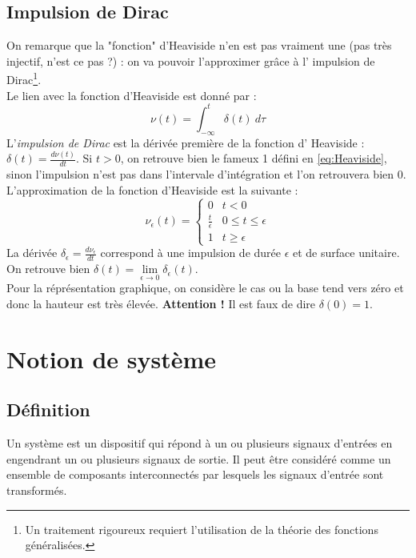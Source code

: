 	\subsection{Impulsion de Dirac}
	On remarque que la "fonction" d'Heaviside n'en est pas vraiment une (pas 
	très injectif, n'est ce pas ?) : on va pouvoir l'approximer grâce à l'
	impulsion de Dirac\footnote{Un traitement rigoureux requiert l'utilisation 
	de la théorie des fonctions généralisées.}.\\
	Le lien avec la fonction d'Heaviside est donné par : 
	\begin{equation}
	\nu(t) = \int_{-\infty}^t \delta(t)\ d\tau
	\end{equation}
	L'\textit{impulsion de Dirac} est la dérivée première de la fonction d'
	Heaviside : $\delta(t) = \frac{d\nu(t)}{dt}$. Si $t>0$, on retrouve bien 
	le fameux 1 défini en \autoref{eq:Heaviside}, sinon l'impulsion n'est pas 
	dans l'intervale d'intégration et l'on retrouvera bien 0.\\
	L'approximation de la fonction d'Heaviside est la suivante :
	\begin{equation}
	\nu_\epsilon(t) = \left\{\begin{array}{ll}
	0 & t<0\\
	\frac{t}{\epsilon}	 & 0\leq t \leq \epsilon\\
	1 & t \geq \epsilon
	\end{array}\right.
	\end{equation}
	La dérivée $\delta_\epsilon = \frac{d\nu_\epsilon}{dt}$ correspond à une 
	impulsion de durée $\epsilon$ et de surface unitaire. On retrouve bien 
	$\delta(t) = \lim\limits_{\epsilon\rightarrow0} \delta_\epsilon(t)$.\\
	Pour la réprésentation graphique, on considère le cas ou la base tend 
	vers zéro et donc la hauteur est très élevée. \textbf{Attention !} Il 
	est faux de dire $\delta(0)=1$.
	
	
\section{Notion de système}
	\subsection{Définition}
	Un système est un dispositif qui répond à un ou plusieurs signaux d’entrées 
	en engendrant un ou plusieurs signaux de sortie. Il peut être considéré 
	comme un ensemble de composants interconnectés par lesquels les signaux 
	d’entrée sont transformés.
	
